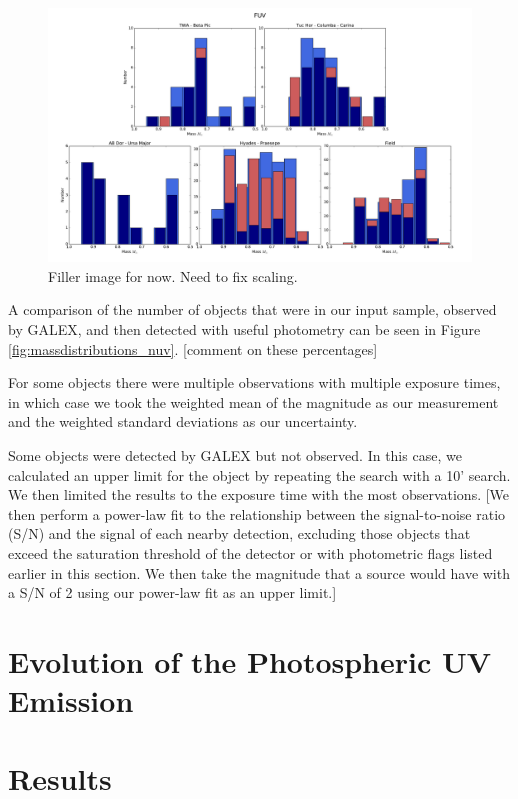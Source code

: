 \documentclass[preprint2]{aastex62}
\begin{document}
\begin{figure}
\centering
\includegraphics[width=.9\linewidth]{massdistributions_fuv.pdf}
\caption{Filler image for now. Need to fix scaling. \label{fig:massdistributions_fuv}}
\end{figure}

A comparison of the number of objects that were in our input sample, observed by GALEX, and then detected with useful photometry can be seen in Figure \ref{fig:massdistributions_nuv}. [comment on these percentages]

For some objects there were multiple observations with multiple exposure times, in which case we took the weighted mean of the magnitude as our measurement and the weighted standard deviations as our uncertainty.

Some objects were detected by GALEX but not observed. In this case, we calculated an upper limit for the object by repeating the search with a 10' search. We then limited the results to the exposure time with the most observations. [We then perform a power-law fit to the relationship between the signal-to-noise ratio (S/N) and the signal of each nearby detection, excluding those objects that exceed the saturation threshold of the detector or with photometric flags listed earlier in this section. We then take the magnitude that a source would have with a S/N of 2 using our power-law fit as an upper limit.]




\section{Evolution of the Photospheric UV Emission}

\section{Results}
\end{document}
